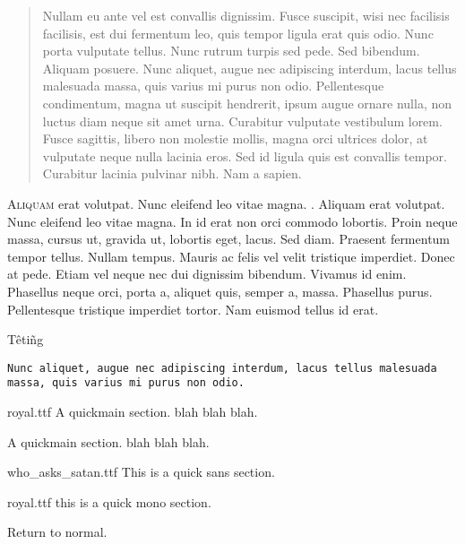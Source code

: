 \documentclass[class=article, crop=false]{standalone}
\author{John Grey}
\date{21-09-2025}
\def\basicTitle{Basic Blah}
\begin{document}
\resptitle{\basicTitle}{\basicTitle}
\renewcommand{\abstractname}{}
\begin{abstract}
Nullam eu ante vel est convallis dignissim.  Fusce suscipit, wisi nec facilisis facilisis, est dui fermentum leo, quis tempor ligula erat quis odio.  Nunc porta vulputate tellus.  Nunc rutrum turpis sed pede.  Sed bibendum.  Aliquam posuere.  Nunc aliquet, augue nec adipiscing interdum, lacus tellus malesuada massa, quis varius mi purus non odio.  Pellentesque condimentum, magna ut suscipit hendrerit, ipsum augue ornare nulla, non luctus diam neque sit amet urna.  Curabitur vulputate vestibulum lorem.  Fusce sagittis, libero non molestie mollis, magna orci ultrices dolor, at vulputate neque nulla lacinia eros.  Sed id ligula quis est convallis tempor.  Curabitur lacinia pulvinar nibh.  Nam a sapien.
\end{abstract}

\hrulefill
\vfill
\pagebreak



\lettrine[lines=3]{A}{liquam} erat volutpat.  Nunc eleifend leo vitae magna. . \cite{abnett07__broth_snake_} 
\rmfamily Aliquam erat volutpat.  Nunc eleifend leo vitae magna.  In id erat non orci commodo lobortis.  Proin neque massa, cursus ut, gravida ut, lobortis eget, lacus.  Sed diam.  Praesent fermentum tempor tellus.  Nullam tempus.  Mauris ac felis vel velit tristique imperdiet.  Donec at pede.  Etiam vel neque nec dui dignissim bibendum.  Vivamus id enim.  Phasellus neque orci, porta a, aliquet quis, semper a, massa.  Phasellus purus.  Pellentesque tristique imperdiet tortor.  Nam euismod tellus id erat.

\begin{center}
  \huge{Têtiñg} 
\end{center}

\normalsize  \tt{Nunc aliquet, augue nec adipiscing interdum, lacus tellus malesuada massa, quis varius mi purus non odio.}

\begin{quickmain}{royal.ttf}
A quickmain section. blah blah blah.
\end{quickmain}

\begin{quickmain}{}
A quickmain section. blah blah blah.
\end{quickmain}

\begin{quickmain}{who_asks_satan.ttf}
  This is a quick sans section.
\end{quickmain}
  
\begin{quickmain}{royal.ttf}
  this is a quick mono section.
\end{quickmain}

\noindent Return to normal.





\IfStandalone{
  \nocite{*}
  
  
  }{}
\end{document}
